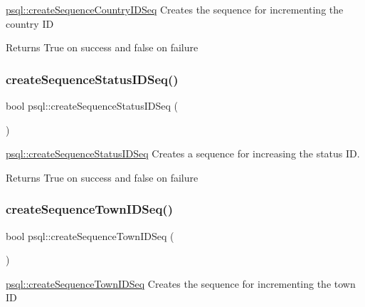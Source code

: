 \mbox{\hyperlink{classpsql_aa907c84f592212451d3d59a2061adabd}{psql\+::create\+Sequence\+Country\+I\+D\+Seq}} Creates the sequence for incrementing the country ID 

\begin{DoxyReturn}{Returns}
True on success and false on failure 
\end{DoxyReturn}
\mbox{\label{classpsql_ae882aa80b2d629383fc2e60aecfd421a}} 
\subsubsection{\texorpdfstring{create\+Sequence\+Status\+I\+D\+Seq()}{createSequenceStatusIDSeq()}}
{\footnotesize\ttfamily bool psql\+::create\+Sequence\+Status\+I\+D\+Seq (\begin{DoxyParamCaption}{ }\end{DoxyParamCaption})}



\mbox{\hyperlink{classpsql_ae882aa80b2d629383fc2e60aecfd421a}{psql\+::create\+Sequence\+Status\+I\+D\+Seq}} Creates a sequence for increasing the status ID. 

\begin{DoxyReturn}{Returns}
True on success and false on failure 
\end{DoxyReturn}
\mbox{\label{classpsql_a6ce21cb5a1e77cb0c280e2932d2b557d}} 
\subsubsection{\texorpdfstring{create\+Sequence\+Town\+I\+D\+Seq()}{createSequenceTownIDSeq()}}
{\footnotesize\ttfamily bool psql\+::create\+Sequence\+Town\+I\+D\+Seq (\begin{DoxyParamCaption}{ }\end{DoxyParamCaption})}



\mbox{\hyperlink{classpsql_a6ce21cb5a1e77cb0c280e2932d2b557d}{psql\+::create\+Sequence\+Town\+I\+D\+Seq}} Creates the sequence for incrementing the town ID 

